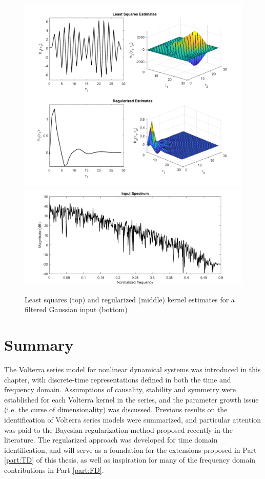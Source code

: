 \begin{figure}[!hp]
\centering
\includegraphics[width = 1.1\textwidth]{Chapter3_VolterraSeries/LSvsReLS_butterworthinput.pdf}
\includegraphics[width = 1.1\textwidth]{Chapter3_VolterraSeries/butterworth_spectrum.pdf}
\caption{Least squares (top) and regularized (middle) kernel estimates for a filtered Gaussian input (bottom)}
\label{fig:ExampleLSvsReLS_VolterraSeries2_filterednoise}
\end{figure}
 
\section{Summary}
 
The Volterra series model for nonlinear dynamical systems was introduced in this chapter, with discrete-time representations defined in both the time and frequency domain. Assumptions of causality, stability and symmetry were established for each Volterra kernel in the series, and the parameter growth issue (i.e. the curse of dimensionality) was discussed. Previous results on the identification of Volterra series models were summarized, and particular attention was paid to the Bayesian regularization method proposed recently in the literature. The regularized approach was developed for time domain identification, and will serve as a foundation for the extensions proposed in Part \ref{part:TD} of this thesis, as well as inspiration for many of the frequency domain contributions in Part \ref{part:FD}.